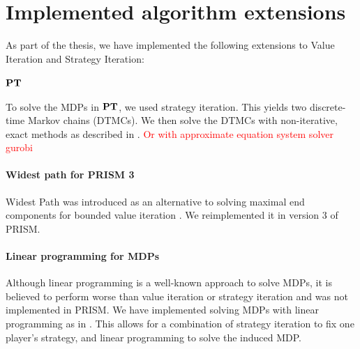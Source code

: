 \chapter{Implemented algorithm extensions} \label{ch:implementedAlgos}
As part of the thesis, we have implemented the following extensions to Value Iteration and Strategy Iteration:

\subsubsection*{$\mathbf{PT}$} To solve the MDPs in $\mathbf{PT}$, we used strategy iteration. This yields two discrete-time Markov chains (DTMCs).
We then solve the DTMCs with non-iterative, exact methods as described in \cite{BaierBook}. \textcolor{red}{Or with approximate equation system solver gurobi}

\subsubsection*{Widest path for PRISM 3}
Widest Path was introduced as an alternative to solving maximal end components for bounded value iteration \cite{widestPath}.
We reimplemented it in version 3 of PRISM.

\subsubsection*{Linear programming for MDPs}
Although linear programming is a well-known approach to solve MDPs, it is believed to perform worse than value iteration or strategy iteration
and was not implemented in PRISM. We have implemented solving MDPs with linear programming as in \cite{Puterman}. 
This allows for a combination of strategy iteration to fix one player's strategy, and linear programming to solve the induced MDP.
